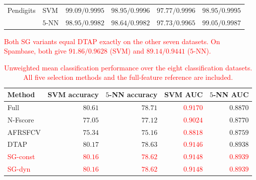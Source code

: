 \documentclass[]{interact}
\theoremstyle{plain}
\theoremstyle{definition}
\theoremstyle{remark}
\begin{document}
\begin{table}[htbp]
\begin{tabular}{llrrrr}
Pendigits & SVM & $99.09/0.9995$ & $98.95/0.9996$ & $97.77/0.9996$ & $98.95/0.9995$ \\
 & $5$-NN & $98.95/0.9982$ & $98.64/0.9982$ & $97.73/0.9965$ & $99.05/0.9987$ \\
\bottomrule
\end{tabular}
\par\smallskip\begin{minipage}{0.97\textwidth}\footnotesize \leavevmode\textcolor{red}{Both SG variants equal DTAP exactly on the other seven datasets. On Spambase, both give $91.86/0.9628$ (SVM) and $89.14/0.9441$ ($5$-NN).} \end{minipage}
\end{table}
\begin{table}[htbp]
\centering\small\setlength{\tabcolsep}{4pt}
\caption{\textcolor{red}{Unweighted mean classification performance over the eight classification datasets. All five selection methods and the full-feature reference are included.}}\label{tab:perf-summary}
\begin{tabular}{lrrrr}
\toprule
Method & SVM accuracy & $5$-NN accuracy & SVM AUC & $5$-NN AUC \\
\midrule
Full & $80.61$ & $78.71$ & \leavevmode\textcolor{red}{$0.9170$} & $0.8870$ \\
N-Fscore & $77.05$ & $77.12$ & \leavevmode\textcolor{red}{$0.9024$} & $0.8770$ \\
AFRSFCV & $75.34$ & $75.16$ & \leavevmode\textcolor{red}{$0.8818$} & $0.8759$ \\
DTAP & $80.17$ & $78.63$ & \leavevmode\textcolor{red}{$0.9146$} & $0.8938$ \\
\leavevmode\textcolor{red}{SG-const} & \leavevmode\textcolor{red}{$80.16$} & \leavevmode\textcolor{red}{$78.62$} & \leavevmode\textcolor{red}{$0.9148$} & \leavevmode\textcolor{red}{$0.8939$} \\
\leavevmode\textcolor{red}{SG-dyn} & \leavevmode\textcolor{red}{$80.16$} & \leavevmode\textcolor{red}{$78.62$} & \leavevmode\textcolor{red}{$0.9148$} & \leavevmode\textcolor{red}{$0.8939$} \\
\bottomrule
\end{tabular}

\end{table}
\end{document}

